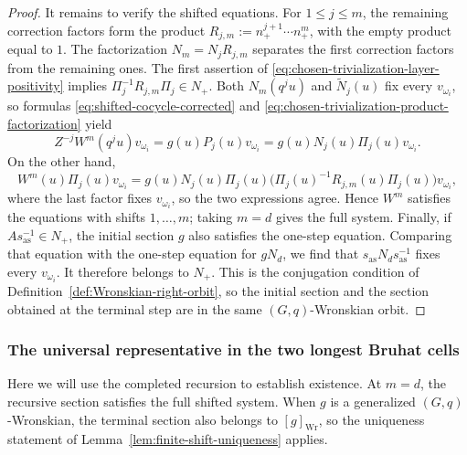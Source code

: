 \documentclass[11pt,leqno]{amsart}
\numberwithin{equation}{section}
\theoremstyle{plain}
\theoremstyle{definition}
\theoremstyle{plain}
\theoremstyle{definition}
\theoremstyle{remark}
\begin{document}
\begin{proof}
It remains to verify the shifted equations.  For $1\le j\le m$, the remaining correction factors form the product $R_{j,m}:=n_+^{j+1}\cdots n_+^m$, with the empty product equal to $1$.  The factorization $N_m=N_jR_{j,m}$ separates the first correction factors from the remaining ones.  The first assertion of \eqref{eq:chosen-trivialization-layer-positivity} implies $\Pi_j^{-1}R_{j,m}\Pi_j\in N_+$.  Both $N_m(q^ju)$ and $\widetilde N_j(u)$ fix every $v_{\omega_i}$, so formulas \eqref{eq:shifted-cocycle-corrected} and \eqref{eq:chosen-trivialization-product-factorization} yield
\[
 Z^{-j}W^m(q^ju)v_{\omega_i}
 =g(u)P_j(u)v_{\omega_i}
 =g(u)N_j(u)\Pi_j(u)v_{\omega_i}.
\]
On the other hand,
\[
 W^m(u)\Pi_j(u)v_{\omega_i}
 =g(u)N_j(u)\Pi_j(u)
  \bigl(\Pi_j(u)^{-1}R_{j,m}(u)\Pi_j(u)\bigr)v_{\omega_i},
\]
where the last factor fixes $v_{\omega_i}$, so the two expressions agree.  Hence $W^m$ satisfies the equations with shifts $1,\ldots,m$; taking $m=d$ gives the full system.  Finally, if $As_{\mathrm{as}}^{-1}\in N_+$, the initial section $g$ also satisfies the one-step equation.  Comparing that equation with the one-step equation for $gN_d$, we find that $s_{\mathrm{as}}N_ds_{\mathrm{as}}^{-1}$ fixes every $v_{\omega_i}$.  It therefore belongs to $N_+$.  This is the conjugation condition of Definition~\ref{def:Wronskian-right-orbit}, so the initial section and the section obtained at the terminal step are in the same $(G,q)$-Wronskian orbit.
\end{proof}

\subsubsection{The universal representative in the two longest Bruhat cells}
Here we will use the completed recursion to establish existence.  At $m=d$, the recursive section satisfies the full shifted system.  When $g$ is a generalized $(G,q)$-Wronskian, the terminal section also belongs to $[g]_{\mathrm{Wr}}$, so the uniqueness statement of Lemma~\ref{lem:finite-shift-uniqueness} applies.
\end{document}

